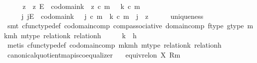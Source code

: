 \begin{isabellebody}
\ \ \isamarkupfalse%
\ \isamarkupfalse%
\ z\ \ {\isachardoublequoteopen}z{\isacharcolon}{\kern0pt}\ E\ {\isasymrightarrow}\ codomain{\isacharparenleft}{\kern0pt}k{\isacharparenright}{\kern0pt}\ {\isasymand}\ z\ {\isasymcirc}\isactrlsub c\ m\ \ {\isacharequal}{\kern0pt}\ k\ {\isasymcirc}\isactrlsub c\ m\ {\isasymand}\isanewline
\ \ \ \ {\isacharparenleft}{\kern0pt}{\isasymforall}\ j{\isachardot}{\kern0pt}\ j{\isacharcolon}{\kern0pt}E\ {\isasymrightarrow}\ codomain{\isacharparenleft}{\kern0pt}k{\isacharparenright}{\kern0pt}\ {\isasymand}\ \ j\ {\isasymcirc}\isactrlsub c\ m\ {\isacharequal}{\kern0pt}\ k\ {\isasymcirc}\isactrlsub c\ m\ {\isasymlongrightarrow}\ j\ {\isacharequal}{\kern0pt}\ z{\isacharparenright}{\kern0pt}{\isachardoublequoteclose}\isanewline
\ \ \ \ \isamarkupfalse%
\ uniqueness\ \isamarkupfalse%
\ {\isacharparenleft}{\kern0pt}smt\ cfunc{\isacharunderscore}{\kern0pt}type{\isacharunderscore}{\kern0pt}def\ codomain{\isacharunderscore}{\kern0pt}comp\ comp{\isacharunderscore}{\kern0pt}associative\ domain{\isacharunderscore}{\kern0pt}comp\ f{\isacharunderscore}{\kern0pt}type\ g{\isacharunderscore}{\kern0pt}type\ m{\isacharunderscore}{\kern0pt}k{\isacharunderscore}{\kern0pt}mh\ m{\isacharunderscore}{\kern0pt}type\ relation{\isacharunderscore}{\kern0pt}k\ relation{\isacharunderscore}{\kern0pt}h{\isacharparenright}{\kern0pt}\isanewline
\isanewline
\ \ \isamarkupfalse%
\ \isamarkupfalse%
\ {\isachardoublequoteopen}k\ {\isacharequal}{\kern0pt}\ h{\isachardoublequoteclose}\isanewline
\ \ \ \ \isamarkupfalse%
\ {\isacharparenleft}{\kern0pt}metis\ cfunc{\isacharunderscore}{\kern0pt}type{\isacharunderscore}{\kern0pt}def\ codomain{\isacharunderscore}{\kern0pt}comp\ m{\isacharunderscore}{\kern0pt}k{\isacharunderscore}{\kern0pt}mh\ m{\isacharunderscore}{\kern0pt}type\ relation{\isacharunderscore}{\kern0pt}k\ relation{\isacharunderscore}{\kern0pt}h{\isacharparenright}{\kern0pt}\isanewline
{}\isamarkupfalse%
%
\endisatagproof
{\isafoldproof}%
%
\isadelimproof
\isanewline
%
\endisadelimproof
\isanewline
{}\isamarkupfalse%
\ canonical{\isacharunderscore}{\kern0pt}quotient{\isacharunderscore}{\kern0pt}map{\isacharunderscore}{\kern0pt}is{\isacharunderscore}{\kern0pt}coequalizer{\isacharcolon}{\kern0pt}\isanewline
\ \ \ {\isachardoublequoteopen}equiv{\isacharunderscore}{\kern0pt}rel{\isacharunderscore}{\kern0pt}on\ X\ {\isacharparenleft}{\kern0pt}R{\isacharcomma}{\kern0pt}m{\isacharparenright}{\kern0pt}{\isachardoublequoteclose}\isanewline

\end{isabellebody}
